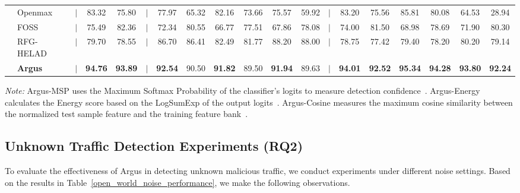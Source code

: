 \documentclass{SCIS2026}
\begin{document}
\begin{table}[ht]
\begin{center}
\begin{threeparttable}
{\begin{tabular}{clccccccccccccccccc}
					& Openmax
					& $|$
					& 83.32 & 75.80
					& $|$
					& 77.97 & 65.32
					& 82.16 & 73.66
					& 75.57 & 59.92
					& $|$
					& 83.20 & 75.56
					& 85.81 & 80.08
					& 64.53 & 28.94 \\ 
					
					& FOSS
					& $|$
					& 75.49 & 82.36
					& $|$
					& 72.34 & 80.55
					& 66.77 & 77.51
					& 67.86 & 78.08
					& $|$
					& 74.00 & 81.50
					& 68.98 & 78.69
					& 71.90 & 80.30 \\ 
					
					& RFG-HELAD
					& $|$
					& 79.70 & 78.55
					& $|$
					& 86.70 & 86.41
					& 82.49 & 81.77
					& 88.20 & 88.00
					& $|$
					& 78.75 & 77.42
					& 79.40 & 78.20
					& 80.20 & 79.14 \\ 
					
					& \textbf{Argus} 
					& $|$
					& \textbf{94.76} & \textbf{93.89} 
					& $|$
					& \textbf{92.54} & 90.50 
					& \textbf{91.82} & 89.50 
					& \textbf{91.94} & 89.63 
					& $|$
					& \textbf{94.01} & \textbf{92.52} 
					& \textbf{95.34} & \textbf{94.28} 
					& \textbf{93.80} & \textbf{92.24} \\ 
					
					\bottomrule
				\end{tabular} 
			}
		\vspace{2pt}
		\begin{tablenotes}[flushleft]
			\footnotesize
			\item[] 
			\parbox{\textwidth}{
				\textit{Note:} 
				Argus-MSP uses the Maximum Softmax Probability of the classifier's logits to measure detection confidence~\cite{MSP}.
				Argus-Energy calculates the Energy score based on the LogSumExp of the output logits~\cite{Energy}.
				Argus-Cosine measures the maximum cosine similarity between the normalized test sample feature and the training feature bank~\cite{Cosine}.
			}
		\end{tablenotes}
		\end{threeparttable} 
	\end{center} 
	\vspace{-0.6cm} 
\end{table}


\subsection{Unknown Traffic Detection Experiments (RQ2)}

To evaluate the effectiveness of Argus in detecting unknown malicious traffic, we conduct experiments under different noise settings. Based on the results in Table~\ref{open_world_noise_performance}, we make the following observations.
\end{document}
